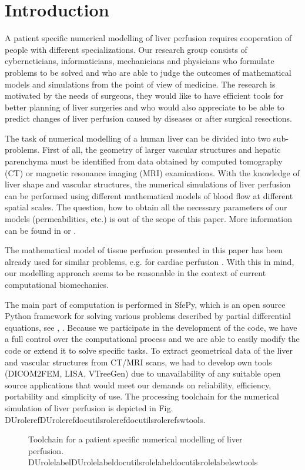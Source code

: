 \documentclass[letterpaper,compsoc,twoside]{IEEEtran}
\providecommand*{\DUrole}[2]{\ifcsname DUrole#1\endcsname \csname DUrole#1\endcsname{#2}\else \ifcsname docutilsrole#1\endcsname \csname docutilsrole#1\endcsname{#2}\else #2\fi \fi }
\begin{document}
\section{Introduction\label{introduction}}


A patient specific numerical modelling of liver perfusion requires
cooperation of people with different specializations. Our research
group consists of cyberneticians, informaticians, mechanicians and
physicians who formulate problems to be solved and who are able to
judge the outcomes of mathematical models and simulations from the
point of view of medicine. The research is motivated by the needs of
surgeons, they would like to have efficient tools for better planning
of liver surgeries and who would also appreciate to be able to predict
changes of liver perfusion caused by diseases or after surgical
resections.

The task of numerical modelling of a human liver can be divided into
two sub-problems. First of all, the geometry of larger vascular
structures and hepatic parenchyma must be identified from data
obtained by computed tomography (CT) or magnetic resonance imaging
(MRI) examinations. With the knowledge of liver shape and vascular
structures, the numerical simulations of liver perfusion can be
performed using different mathematical models of blood flow at
different spatial scales. The question, how to obtain all the
necessary parameters of our models (permeabilities, etc.) is out of
the scope of this paper. More information can be found in \cite{Roh12b} or
\cite{Coo12}.

The mathematical model of tissue perfusion presented in this paper has
been already used for similar problems, e.g. for cardiac perfusion
\cite{Mic13}. With this in mind, our modelling approach seems to be
reasonable in the context of current computational biomechanics.

The main part of computation is performed in SfePy, which is an open
source Python framework for solving various problems described by
partial differential equations, see \cite{Cim14}, \cite{Cim14b}. Because we
participate in the development of the code, we have a full control
over the computational process and we are able to easily modify the
code or extend it to solve specific tasks. To extract geometrical data
of the liver and vascular structures from CT/MRI scans, we had to
develop own tools (DICOM2FEM, LISA, VTreeGen) due to unavailability of
any suitable open source applications that would meet our demands on
reliability, efficiency, portability and simplicity of use. The
processing toolchain for the numerical simulation of liver perfusion
is depicted in Fig. \DUrole{ref}{swtools}.\begin{figure}[]\noindent{}
\caption{Toolchain for a patient specific numerical modelling of liver
perfusion. \DUrole{label}{swtools}}
\end{figure}
\end{document}
